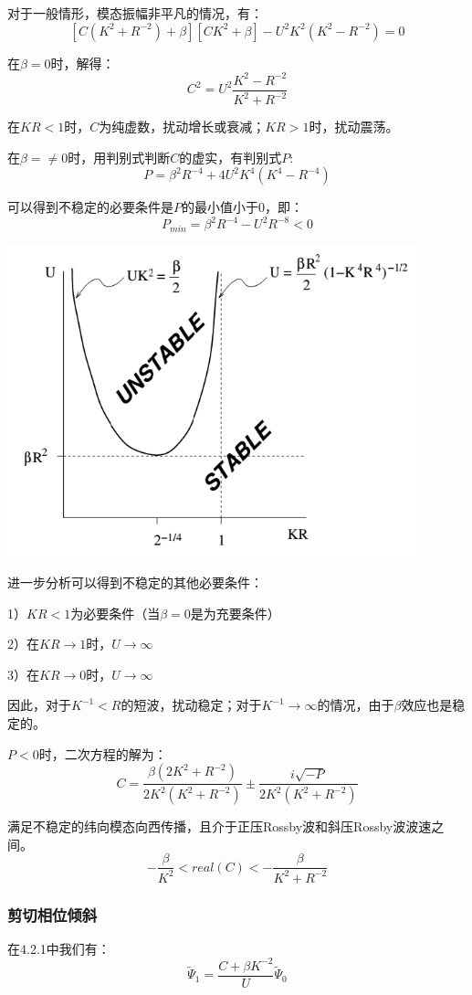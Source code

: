 \documentclass{article}
\begin{document}
对于一般情形，模态振幅非平凡的情况，有：
$$[C(K^2+R^{-2}) +\beta][CK^2 +\beta]-U^2K^2(K^2-R^{-2}) = 0$$

在$\beta=0$时，解得：
$$C^2 = U^2\frac{K^2-R^{-2}}{K^2+R^{-2}}$$

在$KR<1$时，$C$为纯虚数，扰动增长或衰减；$KR>1$时，扰动震荡。

在$\beta=\ne0$时，用判别式判断$C$的虚实，有判别式$P$:
$$P=\beta^2R^{-4}+4U^2K^4(K^4-R^{-4})$$

可以得到不稳定的必要条件是$P$的最小值小于$0$，即：
$$P_{min}=\beta^2R^{-4}-U^2R^{-8}<0$$

\begin{center}
    \includegraphics[width=12cm]{Fig4_3.png}
\end{center}

进一步分析可以得到不稳定的其他必要条件：

1）$KR<1$为必要条件（当$\beta=0$是为充要条件）

2）在$KR \rightarrow 1$时，$U \rightarrow \infty$

3）在$KR \rightarrow 0$时，$U \rightarrow \infty$

因此，对于$K^{-1}<R$的短波，扰动稳定；对于$K^{-1}\rightarrow\infty$的情况，由于$\beta$效应也是稳定的。

$P<0$时，二次方程的解为：
$$C = \frac{\beta(2K^2+R^{-2})}{2K^2(K^2+R^{-2})}\pm\frac{i\sqrt{-P}}{2K^2(K^2+R^{-2})}$$

满足不稳定的纬向模态向西传播，且介于正压Rossby波和斜压Rossby波波速之间。
$$-\frac{\beta}{K^2}<real(C)<-\frac{\beta}{K^2+R^{-2}}$$


\subsubsection{剪切相位倾斜}
在4.2.1中我们有：
$$\tilde{\Psi}_1=\frac{C +\beta K^{-2}}{U}\tilde{\Psi}_0 $$
\end{document}
